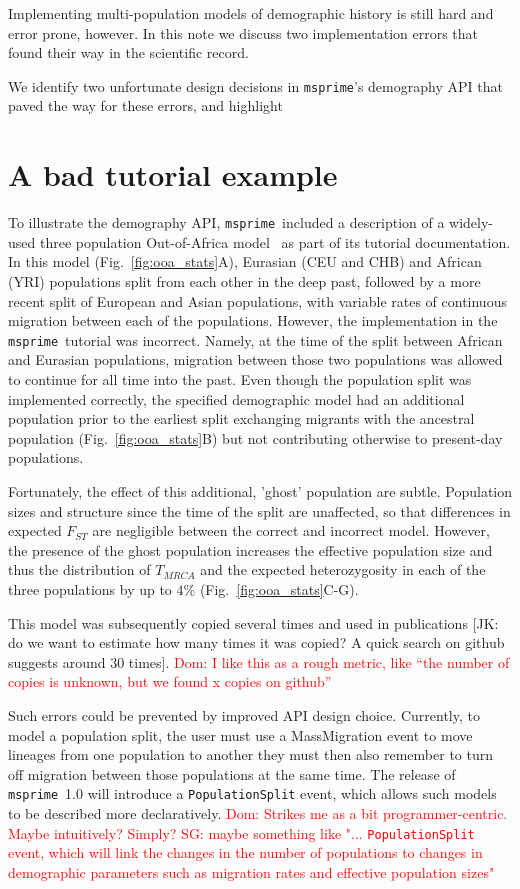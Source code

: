 \documentclass{article}
\newcommand{\msprime}[0]{\texttt{msprime}}
\newcommand{\dncomment}[1]{{\textcolor{red}{Dom: #1}}}
\newcommand{\sgcomment}[1]{{\textcolor{red}{SG: #1}}}
\begin{document}
Implementing multi-population models of demographic history is still hard and error
prone, however. In this note we discuss two implementation errors that found their way 
in the scientific record. 

We identify two unfortunate design decisions in \msprime's demography API 
that paved the way for these errors, and highlight  




\section{A bad tutorial example}

To illustrate the demography API, \msprime\ included a description of a widely-used
three population Out-of-Africa model~\citep{gutenkunst2009inferring} 
as part of its tutorial documentation. In this model (Fig.~\ref{fig:ooa_stats}A),
Eurasian (CEU and CHB) and African (YRI) populations split from each other in the deep past,
followed by a more recent split of European and Asian populations, with variable rates of
continuous migration between each of the populations. However, the implementation in the
\msprime\ tutorial was incorrect. Namely, at the time of the split between African and Eurasian
populations, migration between those two populations was allowed to continue for all time into the
past. Even though the population split was implemented correctly, the specified demographic model had 
an additional population prior to the earliest split exchanging migrants with the ancestral population 
(Fig.~\ref{fig:ooa_stats}B) but not contributing otherwise to present-day populations.  

Fortunately, the effect of this additional, 'ghost' population are subtle. Population sizes and structure since the time of
the split are unaffected, so that differences in expected $F_{ST}$ are negligible between
the correct and incorrect model. However, the presence of the ghost population increases
the effective population size and thus the distribution of $T_{MRCA}$ and the expected 
heterozygosity in each of the three populations by up to $4\%$ (Fig.~\ref{fig:ooa_stats}C-G).

This model was subsequently copied
several times and used in publications [JK: do we want to estimate how
many times it was copied? A quick search on github suggests around 30
times]. \dncomment{I like this as a rough metric, like ``the number of copies
is unknown, but we found x copies on github''}

Such errors could be prevented by improved API design choice.
Currently, to model a population split, the user must use a MassMigration event to move
lineages from one population to another they must then also remember to turn off migration
between those populations at the same time.
The release of \msprime\ 1.0 will introduce a \texttt{PopulationSplit} event, which allows
such models to be described more declaratively.
\dncomment{Strikes me as a bit programmer-centric. Maybe intuitively? Simply?}
\sgcomment{maybe something like "... \texttt{PopulationSplit}  event, which will link the changes in 
the number of populations to changes in demographic parameters such as
migration rates and effective population sizes"  }
\end{document}
